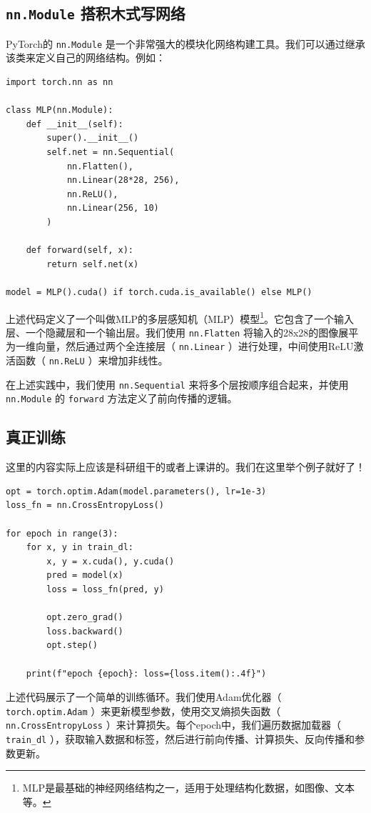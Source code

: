 \subsection{ \texttt{nn.Module} 搭积木式写网络}

PyTorch的 \texttt{nn.Module} 是一个非常强大的模块化网络构建工具。我们可以通过继承该类来定义自己的网络结构。例如：

\begin{verbatim}
import torch.nn as nn

class MLP(nn.Module):
    def __init__(self):
        super().__init__()
        self.net = nn.Sequential(
            nn.Flatten(),
            nn.Linear(28*28, 256),
            nn.ReLU(),
            nn.Linear(256, 10)
        )

    def forward(self, x):
        return self.net(x)

model = MLP().cuda() if torch.cuda.is_available() else MLP()
\end{verbatim}

上述代码定义了一个叫做MLP的多层感知机（MLP）模型\footnote{MLP是最基础的神经网络结构之一，适用于处理结构化数据，如图像、文本等。}。它包含了一个输入层、一个隐藏层和一个输出层。我们使用 \texttt{nn.Flatten} 将输入的28x28的图像展平为一维向量，然后通过两个全连接层（ \texttt{nn.Linear} ）进行处理，中间使用ReLU激活函数（ \texttt{nn.ReLU} ）来增加非线性。

在上述实践中，我们使用 \texttt{nn.Sequential} 来将多个层按顺序组合起来，并使用 \texttt{nn.Module} 的 \texttt{forward} 方法定义了前向传播的逻辑。

\subsection{真正训练}

这里的内容实际上应该是科研组干的或者上课讲的。我们在这里举个例子就好了！

\begin{verbatim}
opt = torch.optim.Adam(model.parameters(), lr=1e-3)
loss_fn = nn.CrossEntropyLoss()

for epoch in range(3):
    for x, y in train_dl:
        x, y = x.cuda(), y.cuda()
        pred = model(x)
        loss = loss_fn(pred, y)

        opt.zero_grad()
        loss.backward()
        opt.step()

    print(f"epoch {epoch}: loss={loss.item():.4f}")
\end{verbatim}

上述代码展示了一个简单的训练循环。我们使用Adam优化器（ \texttt{torch.optim.Adam} ）来更新模型参数，使用交叉熵损失函数（ \texttt{nn.CrossEntropyLoss} ）来计算损失。每个epoch中，我们遍历数据加载器（ \texttt{train\_dl} ），获取输入数据和标签，然后进行前向传播、计算损失、反向传播和参数更新。

